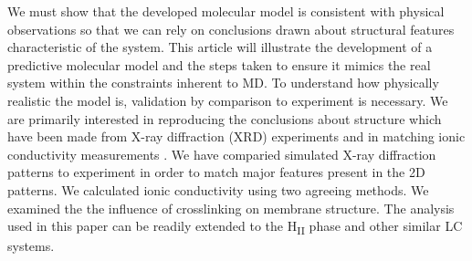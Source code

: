 We must show that the developed molecular model is consistent with
physical observations so that we can rely on conclusions drawn about %
structural features characteristic of the system. This article will
illustrate the development of a predictive molecular model and the steps
taken to ensure it mimics the real system within the constraints 
inherent to MD. To understand how physically realistic the model is,
validation by comparison to experiment is necessary. We are primarily
interested in reproducing the conclusions about structure which have been
made from X-ray diffraction (XRD) experiments and in matching ionic conductivity measurements
\cite{feng_thin_2016}. We have comparied simulated X-ray diffraction
patterns to experiment in order to match major features present in the
2D patterns. We calculated ionic conductivity using two agreeing methods.
We examined the the influence of crosslinking on membrane structure. 
The analysis used in this paper can be readily extended to the 
H\textsubscript{II} phase and other similar LC systems.
